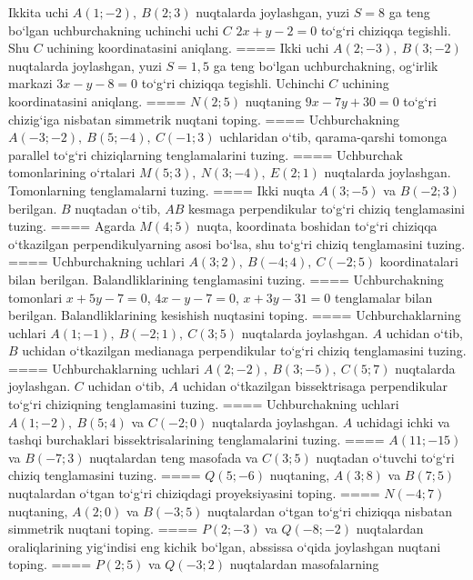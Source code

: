 Ikkita uchi \(A (1; - 2),\ B (2;3) \) nuqtalarda joylashgan,
yuzi \(S = 8\) ga teng bo‘lgan uchburchakning uchinchi uchi
$C$ \(2x + y - 2 = 0\) to‘g‘ri chiziqqa tegishli. Shu $C$ uchining
koordinatasini aniqlang.
====
Ikki uchi \(A (2; - 3),\ B (3; - 2) \) nuqtalarda
joylashgan, yuzi \(S = 1,5\) ga teng bo‘lgan uchburchakning,
og‘irlik markazi \(3x - y - 8 = 0\) to‘g‘ri chiziqqa tegishli. Uchinchi $C$
uchining koordinatasini aniqlang.
====
\(N (2; 5) \) nuqtaning \(9x - 7y + 30 = 0\) to‘g‘ri chizig‘iga
nisbatan simmetrik nuqtani toping.
====
Uchburchakning \(A (- 3; - 2),\ B (5; - 4),\ C (- 1;3) \)
uchlaridan o‘tib, qarama-qarshi tomonga parallel to‘g‘ri chiziqlarning tenglamalarini
tuzing.
====
Uchburchak tomonlarining o‘rtalari
\(M (5;3),\ N (3; - 4),\ E (2;1) \) nuqtalarda joylashgan. Tomonlarning
tenglamalarni tuzing.
====
Ikki nuqta \(A (3; - 5) \) va \(B (- 2;3) \) berilgan.
$B$ nuqtadan o‘tib, $AB$ kesmaga perpendikular to‘g‘ri chiziq
tenglamasini tuzing.
====
Agarda \(M (4;5) \) nuqta, koordinata boshidan to‘g‘ri chiziqqa
o‘tkazilgan perpendikulyarning asosi bo‘lsa, shu to‘g‘ri chiziq tenglamasini
tuzing.
====
Uchburchakning uchlari
\(A (3;2),\ B (- 4;4),\ C (- 2; 5) \) koordinatalari bilan berilgan.
Balandliklarining tenglamasini tuzing.
====
Uchburchakning tomonlari \(x + 5y - 7 = 0\),
\(4x - y - 7 = 0\), \(x + 3y - 31 = 0\) tenglamalar bilan berilgan.
Balandliklarining kesishish nuqtasini toping.
====
Uchburchaklarning uchlari
\(A (1; - 1),\ B (- 2;1),\ C (3;5) \) nuqtalarda joylashgan. $A$
uchidan o‘tib, $B$ uchidan o‘tkazilgan medianaga
perpendikular to‘g‘ri chiziq tenglamasini tuzing.
====
Uchburchaklarning uchlari
\(A (2; - 2),\ B (3; - 5),\ C (5;7) \) nuqtalarda joylashgan. $C$
uchidan o‘tib, $A$ uchidan o‘tkazilgan bissektrisaga
perpendikular to‘g‘ri chiziqning tenglamasini tuzing.
====
Uchburchakning uchlari \(A (1;-2),\ B (5; 4) \) va
\(C (-2;0) \) nuqtalarda joylashgan. $A$ uchidagi ichki va tashqi
burchaklari bissektrisalarining tenglamalarini tuzing.
====
\(A (11; - 15) \) va \(B (-7;3) \) nuqtalardan
teng masofada va \(C (3; 5) \) nuqtadan o‘tuvchi to‘g‘ri chiziq tenglamasini
tuzing.
====
\(Q (5; - 6) \) nuqtaning, \(A (3;8) \) va \(B (7;5) \)
nuqtalardan o‘tgan to‘g‘ri chiziqdagi proyeksiyasini toping.
====
\(N (- 4; 7) \) nuqtaning, \(A (2;0) \) va \(B (- 3;5) \)
nuqtalardan o‘tgan to‘g‘ri chiziqqa nisbatan simmetrik nuqtani toping.
====
\(P (2; - 3) \) va \(Q (- 8; - 2) \) nuqtalardan
oraliqlarining yig‘indisi eng kichik bo‘lgan, abssissa o‘qida joylashgan
nuqtani toping.
====
\(P (2;5) \) va \(Q (- 3;2) \) nuqtalardan masofalarning
